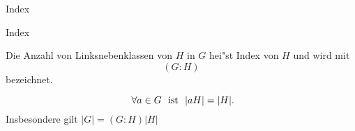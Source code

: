 \documentclass[class=article, crop=false]{standalone}
\begin{document}
\begin{zettel}{Index}
\begin{flashcard}[p6680ans]{Index}
	\begin{definition}[Index]
		Die Anzahl von Linksnebenklassen von $H$ in $G$ hei"st Index von $H$ und wird mit
		\[
			(G:H)
		\]
		bezeichnet.
	\end{definition}
\end{flashcard}
\begin{theorem}
	\[
		\forall a \in  G \tx{ ist } |aH| = |H|
	.\]
	Insbesondere gilt $ |G| = (G:H) |H|$
\end{theorem}
\end{zettel}
\end{document}
